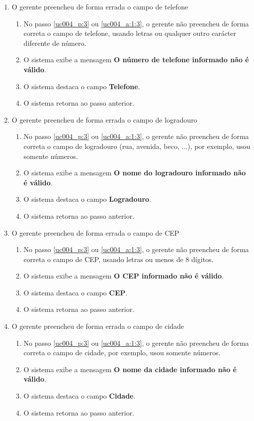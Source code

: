 \begin{enumerate}[label=E\arabic*]
	\item O gerente preencheu de forma errada o campo de telefone \label{uc004_e:4}
	\begin{enumerate}[label*=.\arabic*]		
		\item[] No passo \ref{uc004_p:3} ou \ref{uc004_a:1:3}, o gerente não preencheu de forma correta o campo de telefone, usando letras ou qualquer outro carácter diferente de número.		
		\item O sistema exibe a mensagem \textbf{O número de telefone informado não é válido}.
		\item O sistema destaca o campo \textbf{Telefone}.
		\item O sistema retorna ao passo anterior.
	\end{enumerate}
	
	\item O gerente preencheu de forma errada o campo de logradouro \label{uc004_e:5}
	\begin{enumerate}[label*=.\arabic*]		
		\item[] No passo \ref{uc004_p:3} ou \ref{uc004_a:1:3}, o gerente não preencheu de forma correta o campo de logradouro (rua, avenida, beco, ...), por exemplo, usou somente números.		
		\item O sistema exibe a mensagem \textbf{O nome do logradouro informado não é válido}.
		\item O sistema destaca o campo \textbf{Logradouro}.
		\item O sistema retorna ao passo anterior.
	\end{enumerate}
	
	\item O gerente preencheu de forma errada o campo de CEP \label{uc004_e:6}
	\begin{enumerate}[label*=.\arabic*]		
		\item[] No passo \ref{uc004_p:3} ou \ref{uc004_a:1:3}, o gerente não preencheu de forma correta o campo de CEP, usando letras ou menos de 8 dígitos.		
		\item O sistema exibe a mensagem \textbf{O CEP informado não é válido}.
		\item O sistema destaca o campo \textbf{CEP}.
		\item O sistema retorna ao passo anterior.
	\end{enumerate}
	
	\item O gerente preencheu de forma errada o campo de cidade \label{uc004_e:7}
	\begin{enumerate}[label*=.\arabic*]		
		\item[] No passo \ref{uc004_p:3} ou \ref{uc004_a:1:3}, o gerente não preencheu de forma correta o campo de cidade, por exemplo, usou somente números.		
		\item O sistema exibe a mensagem \textbf{O nome da cidade informado não é válido}.
		\item O sistema destaca o campo \textbf{Cidade}.
		\item O sistema retorna ao passo anterior.
	\end{enumerate}	
	

\end{enumerate}
